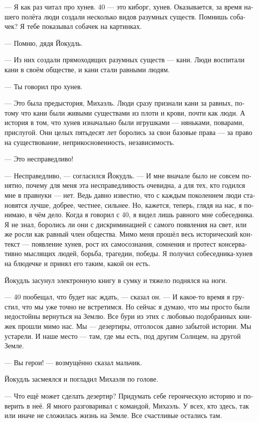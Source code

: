 \documentclass[a4paper,10pt,fleqn]{book}\usepackage{polyglossia}\setdefaultlanguage[babelshorthands=true]{russian}\setotherlanguage{english}\defaultfontfeatures{Ligatures=TeX,Mapping=tex-text}\usepackage{xcolor}\newcommand{\ml}[3]{#2}
\begin{document}
--- Я как раз читал про хунев.
40 --- это киборг, хунев.
Оказывается, за время нашего полёта люди создали несколько видов разумных существ.
Помнишь собачек?
Я тебе показывал собачек на картинках.

--- Помню, дядя Йокудль.

--- Из них создали прямоходящих разумных существ --- кани.
Люди воспитали кани в своём обществе, и кани стали равными людям.

--- Ты говорил про хунев.

--- Это была предыстория, Михаэль.
Люди сразу признали кани за равных, потому что кани были живыми существами из плоти и крови, почти как люди.
А история в том, что хунев изначально были игрушками --- няньками, поварами, прислугой.
Они целых пятьдесят лет боролись за свои базовые права --- за право на существование, неприкосновенность, независимость.

--- Это несправедливо!

--- Несправедливо, --- согласился Йокудль.
--- И мне вначале было не совсем понятно, почему для меня эта несправедливость очевидна, а для тех, кто годился мне в правнуки --- нет.
Ведь давно известно, что с каждым поколением люди становятся лучше, добрее, честнее, сильнее.
Но, кажется, теперь, глядя на нас, я понимаю, в чём дело.
Когда я говорил с 40, я видел лишь равного мне собеседника.
Я не знал, боролись ли они с дискриминацией с самого появления на свет, или же росли как равный член общества.
Мимо меня прошёл весь исторический контекст --- появление хунев, рост их самосознания, сомнения и протест консервативно мыслящих людей, борьба, трагедии, победы.
Я получил собеседника-хунев на блюдечке и принял его таким, какой он есть.

Йокудль засунул электронную книгу в сумку и тяжело поднялся на ноги.

--- 40 пообещал, что будет нас ждать, --- сказал он.
--- И какое-то время я грустил, что мы уже точно не встретимся.
Но сейчас я думаю, что мы просто были недостойны вернуться на Землю.
Все бури из этих с любовью подобранных книжек прошли мимо нас.
Мы --- дезертиры, отголосок давно забытой истории.
Мы устарели.
И наше место --- там, где мы есть, под другим Солнцем, на другой Земле.

--- Вы герои! --- возмущённо сказал мальчик.

Йокудль засмеялся и погладил Михаэля по голове.

--- Что ещё может сделать дезертир?
Придумать себе героическую историю и поверить в неё.
Я много разговаривал с командой, Михаэль.
У всех, кто здесь, так или иначе не сложилась жизнь на Земле.
Все счастливые остались там.
\end{document}
